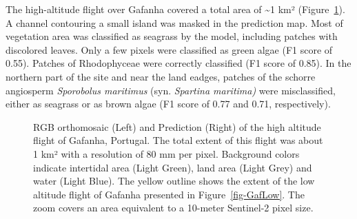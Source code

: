 \documentclass[
  number]{elsarticle}
\begin{document}
The high-altitude flight over Gafanha covered a total area of
\textasciitilde1 km² (Figure~\ref{fig-GafHigh}). A channel contouring a
small island was masked in the prediction map. Most of vegetation area
was classified as seagrass by the model, including patches with
discolored leaves. Only a few pixels were classified as green algae (F1
score of 0.55). Patches of Rhodophyceae were correctly classified (F1
score of 0.85). In the northern part of the site and near the land
eadges, patches of the schorre angiosperm \emph{Sporobolus maritimus}
(syn. \emph{Spartina maritima)} were misclassified, either as seagrass
or as brown algae (F1 score of 0.77 and 0.71, respectively).

\label{cell-fig-GafHigh}
\begin{figure}[H]


\caption{\label{fig-GafHigh}RGB orthomosaic (Left) and Prediction
(Right) of the high altitude flight of Gafanha, Portugal. The total
extent of this flight was about 1 km² with a resolution of 80 mm per
pixel. Background colors indicate intertidal area (Light Green), land
area (Light Grey) and water (Light Blue). The yellow outline shows the
extent of the low altitude flight of Gafanha presented in
Figure~\ref{fig-GafLow}. The zoom covers an area equivalent to a
10-meter Sentinel-2 pixel size.}

\end{figure}%
\end{document}
